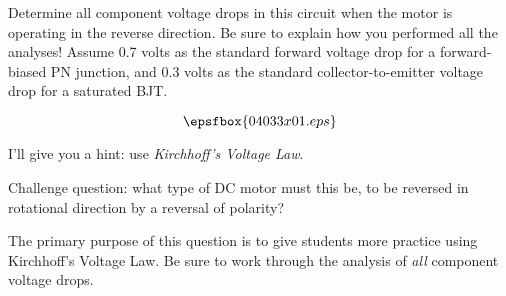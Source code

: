 

Determine all component voltage drops in this circuit when the motor is operating in the reverse direction.  Be sure to explain how you performed all the analyses!  Assume 0.7 volts as the standard forward voltage drop for a forward-biased PN junction, and 0.3 volts as the standard collector-to-emitter voltage drop for a saturated BJT.

$$\epsfbox{04033x01.eps}$$







I'll give you a hint: use {\it Kirchhoff's Voltage Law}.

\vskip 10pt

Challenge question: what type of DC motor must this be, to be reversed in rotational direction by a reversal of polarity?







The primary purpose of this question is to give students more practice using Kirchhoff's Voltage Law.  Be sure to work through the analysis of {\it all} component voltage drops.




